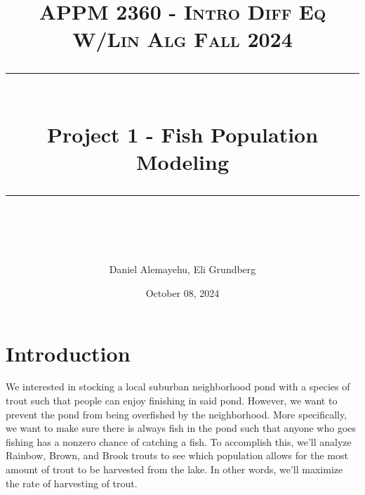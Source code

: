 \documentclass[letterpaper,12pt]{article}
\title{
\normalfont \normalsize 
\textsc{APPM 2360 - Intro Diff Eq W/Lin Alg \hfill Fall 2024} \\
[10pt] 
\rule{\linewidth}{0.5pt} \\[6pt] 
\huge Project 1 - Fish Population Modeling \\
\rule{\linewidth}{2pt}  \\[10pt]
}
\date{October 08, 2024}
\author{Daniel Alemayehu, Eli Grundberg}
\begin{document}
\begin{titlingpage}
\maketitle
\end{titlingpage}
\newpage
\tableofcontents
\newpage

\section{Introduction}
We interested in stocking a local suburban neighborhood pond with a species of trout such that people can enjoy finishing in said pond. 
However, we want to prevent the pond from being overfished by the neighborhood.
More specifically, we want to make sure there is always fish in the pond such that anyone who goes fishing has a nonzero chance of catching a fish. 
To accomplish this, we'll analyze Rainbow, Brown, and Brook trouts to see which population allows for the most amount of trout to be harvested from the lake.
In other words, we'll maximize the rate of harvesting of trout.
\end{document}
